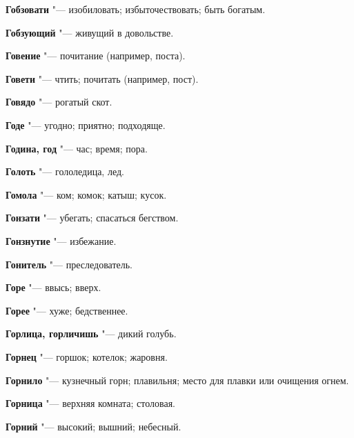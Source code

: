 \begin{mymulticols}{2}
\noindent\textbf{Гобзовати} "--- изобиловать; избыточествовать; быть богатым. 




\noindent\textbf{Гобзующий} "--- живущий в довольстве. 




\noindent\textbf{Говение} "--- почитание (например, поста). 




\noindent\textbf{Говети} "--- чтить; почитать (например, пост). 




\noindent\textbf{Говядо} "--- рогатый скот. 




\noindent\textbf{Годе} "--- угодно; приятно; подходяще. 




\noindent\textbf{Година, год} "--- час; время; пора. 




\noindent\textbf{Голоть} "--- гололедица, лед. 




\noindent\textbf{Гомола} "--- ком; комок; катыш; кусок. 




\noindent\textbf{Гонзати} "--- убегать; спасаться бегством. 




\noindent\textbf{Гонзнутие} "--- избежание. 




\noindent\textbf{Гонитель} "--- преследователь. 




\noindent\textbf{Горе} "--- ввысь; вверх. 




\noindent\textbf{Горее} "--- хуже; бедственнее. 




\noindent\textbf{Горлица, горличишь} "--- дикий голубь. 




\noindent\textbf{Горнец} "--- горшок; котелок; жаровня. 




\noindent\textbf{Горнило} "--- кузнечный горн; плавильня; место для плавки или очищения огнем. 




\noindent\textbf{Горница} "--- верхняя комната; столовая. 




\noindent\textbf{Горний} "--- высокий; вышний; небесный. 





\end{mymulticols}
